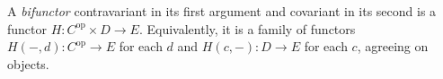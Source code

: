 A \emph{bifunctor} contravariant in its first argument and covariant in its second is a functor $H: C^{\mathrm{op}} \times D \to E$. Equivalently, it is a family of functors $H(-, d): C^{\mathrm{op}} \to E$ for each $d$ and $H(c, -): D \to E$ for each $c$, agreeing on objects.
